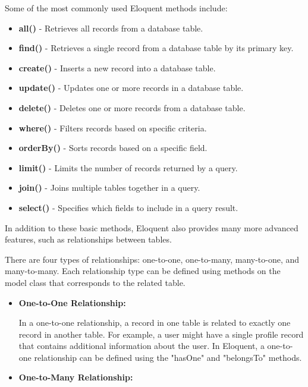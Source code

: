 \begin{itemize}
Some of the most commonly used Eloquent methods include:
\begin{itemize}
     
    \item \textbf{all()} - Retrieves all records from a database table.
    
    \item \textbf{find()} - Retrieves a single record from a database table by its primary key.
    
    \item \textbf{create()} - Inserts a new record into a database table.

    \item \textbf{update()} - Updates one or more records in a database table.

    \item \textbf{delete()} - Deletes one or more records from a database table.

    \item \textbf{where()} - Filters records based on specific criteria.

    \item \textbf{orderBy()} - Sorts records based on a specific field.

    \item \textbf{limit()} - Limits the number of records returned by a query.

    \item \textbf{join()} - Joins multiple tables together in a query.

    \item \textbf{select()} - Specifies which fields to include in a query result.
\end{itemize}
In addition to these basic methods, Eloquent also provides many more advanced features, such as relationships between tables. 

There are four types of relationships: one-to-one, one-to-many, many-to-one, and many-to-many. Each relationship type can be defined using methods on the model class that corresponds to the related table.
\begin{itemize}
    \item \textbf{One-to-One Relationship:}
    
    In a one-to-one relationship, a record in one table is related to exactly one record in another table. For example, a user might have a single profile record that contains additional information about the user. In Eloquent, a one-to-one relationship can be defined using the "hasOne" and "belongsTo" methods.
    \item \textbf{One-to-Many Relationship:}
    

\end{itemize}
\end{itemize}
